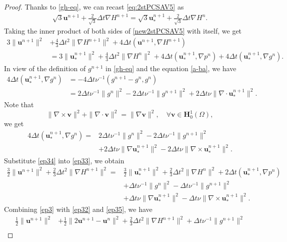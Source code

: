 \documentclass[10pt,a4paper]{amsart}
\newcommand{\uu}{\mathrm{\textbf{u}}}
\newcommand{\vv}{\mathrm{\textbf{v}}}
\begin{document}
\begin{proof}
Thanks to \eqref{gh-eq}, we can recast \eqref{eq:2stPCSAV5} as
\begin{align}\label{new2stPCSAV5}
\sqrt{3}\uu^{n+1}+\frac{2}{\sqrt{3}}\Delta t\nabla H^{n+1}=\sqrt{3}\uu_*^{n+1}+\frac{2}{\sqrt{3}}\Delta t\nabla H^{n}.
\end{align}
Taking the inner product of both sides of \eqref{new2stPCSAV5} with itself, we get
\begin{align}\label{ep33}
3\|\uu^{n+1}\|^2&+\frac{4}{3}\Delta t^2\|\nabla H^{n+1}\|^2+4\Delta t\left(\uu^{n+1},\nabla H^{n+1}\right)\\
&=3\|\uu_*^{n+1}\|^2+\frac{4}{3}\Delta t^2\|\nabla H^{n}\|^2+4\Delta t\left(\uu_*^{n+1},\nabla p^{n}\right)+4\Delta t\left(\uu_*^{n+1},\nabla g^{n}\right)\nonumber.
\end{align}
In view of the definition of $g^{n+1}$ in \eqref{gh-eq} and the equation \eqref{a-ba}, we have 
\begin{align}
4\Delta t\left(\uu_*^{n+1},\nabla g^{n}\right)&=-4\Delta t\nu^{-1}\left(g^{n+1}-g^n,g^n\right)\nonumber\\
&=2\Delta t\nu^{-1}\|g^n\|^2-2\Delta t\nu^{-1}\|g^{n+1}\|^2+2\Delta t\nu\|\nabla\cdot\uu_*^{n+1}\|^2.\nonumber
\end{align}
Note that 
$$\|\nabla\times\vv\|^2+\|\nabla\cdot\vv\|^2=\|\nabla\vv\|^2,\quad\forall\vv\in \mathbf{H}_0^1(\Omega),$$
we get
\begin{align}\label{ep34}
4\Delta t\left(\uu_*^{n+1},\nabla g^{n}\right)
=&2\Delta t\nu^{-1}\|g^n\|^2-2\Delta t\nu^{-1}\|g^{n+1}\|^2\\
&+2\Delta t\nu\|\nabla\uu_*^{n+1}\|^2-2\Delta t\nu\|\nabla\times\uu_*^{n+1}\|^2.\nonumber
\end{align}
Substitute \eqref{ep34} into \eqref{ep33}, we obtain 
\begin{align}\label{ep35}
\frac{3}{2}\|\uu^{n+1}\|^2+\frac{2}{3}\Delta t^2\|\nabla H^{n+1}\|^2
=&\frac{3}{2}\|\uu_*^{n+1}\|^2+\frac{2}{3}\Delta t^2\|\nabla H^{n}\|^2
+2\Delta t\left(\uu_*^{n+1},\nabla p^{n}\right)\nonumber\\
&+\Delta t\nu^{-1}\|g^n\|^2-\Delta t\nu^{-1}\|g^{n+1}\|^2\\
&+\Delta t\nu\|\nabla\uu_*^{n+1}\|^2-\Delta t\nu\|\nabla\times\uu_*^{n+1}\|^2\nonumber.
\end{align}
Combining \eqref{ep3} with \eqref{ep32} and \eqref{ep35}, we have
\begin{align}\label{ep5}
\frac{1}{2}\|\uu^{n+1}\|^2&+\frac{1}{2}\|2\uu^{n+1}-\uu^n\|^2+\frac{2}{3}\Delta t^2\|\nabla H^{n+1}\|^2+\Delta t\nu^{-1}\|g^{n+1}\|^2\nonumber\\

\end{align}
\end{proof}
\end{document}

